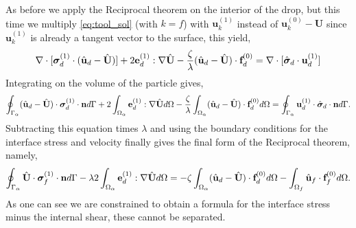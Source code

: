 As before we apply the Reciprocal theorem on the interior of the drop,
but this time we multiply \ref{eq:tool_sol} (with $k = f$) with $\textbf{u}_k^{(1)}$ instead of $\textbf{u}_k^{(0)} - \textbf{U}$ since $\textbf{u}_k^{(1)}$ is already a tangent vector to the surface, this yield,
\begin{equation*}
     \mathbf{\nabla}\cdot [\bm\sigma_d^{(1)} \cdot (\hat{\textbf{u}}_d - \hat{\textbf{U}})]
     +2 \textbf{e}_d^{(1)} : \mathbf{\nabla} \hat{\textbf{U}}
    - 
    \frac{\zeta}{\lambda}(\hat{\textbf{u}}_d - \hat{\textbf{U}}) \cdot \textbf{f}_d^{(0)}
    =
     \mathbf{\nabla}\cdot [\hat{\bm\sigma}_d \cdot \textbf{u}_d^{(1)}]
\end{equation*}
Integrating on the volume of the particle gives, 
\begin{equation*}
    \oint_{\Gamma_{\alpha}}  (\hat{\textbf{u}}_d - \hat{\textbf{U}})\cdot \bm\sigma_d^{(1)} \cdot \textbf{n} d\Gamma
    + 2 \int_{\Omega_{\alpha}}  \textbf{e}_d^{(1)} : \mathbf{\nabla} \hat{\textbf{U}}  d\Omega
    - \frac{\zeta}{\lambda} \int_{\Omega_{\alpha}} (\hat{\textbf{u}}_d - \hat{\textbf{U}}) \cdot \textbf{f}_d^{(0)} d\Omega
    =
    \oint_{\Gamma_{\alpha}} 
         \textbf{u}_d^{(1)}\cdot\hat{\bm\sigma}_d \cdot \textbf{n}
     d\Gamma. 
\end{equation*}
Subtracting this equation times $\lambda$ and using the boundary conditions  for the interface stress and velocity finally gives the final form of the Reciprocal theorem, namely, 
\begin{equation*}
    \oint_{\Gamma_{\alpha}} \hat{\textbf{U}}\cdot  \bm\sigma_f^{(1)} \cdot \textbf{n} d\Gamma
    -\lambda 2 \int_{\Omega_{\alpha}}  \textbf{e}_d^{(1)} : \mathbf{\nabla} \hat{\textbf{U}}  d\Omega
    = 
    - \zeta \int_{\Omega_{\alpha}} (\hat{\textbf{u}}_d - \hat{\textbf{U}}) \cdot \textbf{f}_d^{(0)} d\Omega
    - \int_{\Omega_f} \hat{\textbf{u}}_f\cdot  \textbf{f}^{(0)}_f d\Omega.
    \label{eq:reciprocal_f_one}
\end{equation*}
As one can see we are constrained to obtain a formula for the interface stress minus the internal shear, these cannot be separated. 

